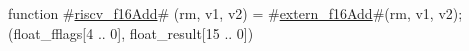 function #\hyperref[sailRISCVzriscvzyf16Add]{riscv\_f16Add}# (rm, v1, v2) = {
  #\hyperref[sailRISCVzexternzyf16Add]{extern\_f16Add}#(rm, v1, v2);
  (float_fflags[4 .. 0], float_result[15 .. 0])
}
